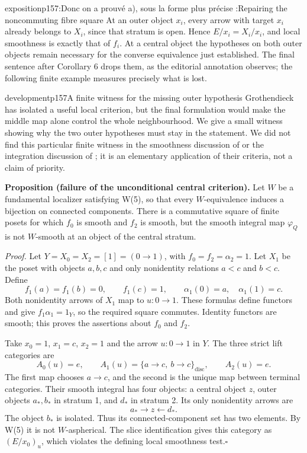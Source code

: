 \begin{dcomment}{exposition}{p157:Donc on a prouvé a), sous la forme plus précise :}{Repairing the noncommuting fibre square}
At an outer object $x_i$, every arrow with target $x_i$ already belongs to $X_i$, since that stratum is open. Hence $E/x_i=X_i/x_i$, and local smoothness is exactly that of $f_i$. At a central object the hypotheses on both outer objects remain necessary for the converse equivalence just established. The final sentence after Corollary 6 drops them, as the editorial annotation observes; the following finite example measures precisely what is lost.
\end{dcomment}

\begin{dcomment}{development}{p157}{A finite witness for the missing outer hypothesis}
Grothendieck has isolated a useful local criterion, but the final formulation would make the middle map alone control the whole neighbourhood. We give a small witness showing why the two outer hypotheses must stay in the statement. We did not find this particular finite witness in the smoothness discussion of \citet{Maltsiniotis2005Asphericite} or the integration discussion of \citet[\S3.3]{Cisinski2006}; it is an elementary application of their criteria, not a claim of priority.

\textbf{Proposition (failure of the unconditional central criterion).}\ours
Let $W$ be a fundamental localizer satisfying W(5), so that every $W$-equivalence induces a bijection on connected components. There is a commutative square of finite posets for which $f_0$ is smooth and $f_2$ is smooth, but the smooth integral map $\varphi_Q$ is not $W$-smooth at an object of the central stratum.

\textit{Proof.} Let $Y=X_0=X_2=[1]=(0\to1)$, with $f_0=f_2=\alpha_2=1$. Let $X_1$ be the poset with objects $a,b,c$ and only nonidentity relations $a<c$ and $b<c$. Define
\[
 f_1(a)=f_1(b)=0,\qquad f_1(c)=1,
 \qquad \alpha_1(0)=a,\quad\alpha_1(1)=c.
\]
Both nonidentity arrows of $X_1$ map to $u:0\to1$. These formulas define functors and give $f_1\alpha_1=1_Y$, so the required square commutes. Identity functors are smooth; this proves the assertions about $f_0$ and $f_2$.

Take $x_0=1$, $x_1=c$, $x_2=1$ and the arrow $u:0\to1$ in $Y$. The three strict lift categories are
\[
 A_0(u)=e,\qquad A_1(u)=\{a\to c,\ b\to c\}_{\mathrm{disc}},
 \qquad A_2(u)=e.
\]
The first map chooses $a\to c$, and the second is the unique map between terminal categories. Their smooth integral has four objects: a central object $z$, outer objects $a_*,b_*$ in stratum 1, and $d_*$ in stratum 2. Its only nonidentity arrows are
\[
                 a_*\longrightarrow z\longleftarrow d_*.
\]
The object $b_*$ is isolated. Thus its connected-component set has two elements. By W(5) it is not $W$-aspherical. The slice identification gives this category as $(E/x_0)_u$, which violates the defining local smoothness test.\hfill$\square$


\end{dcomment}
